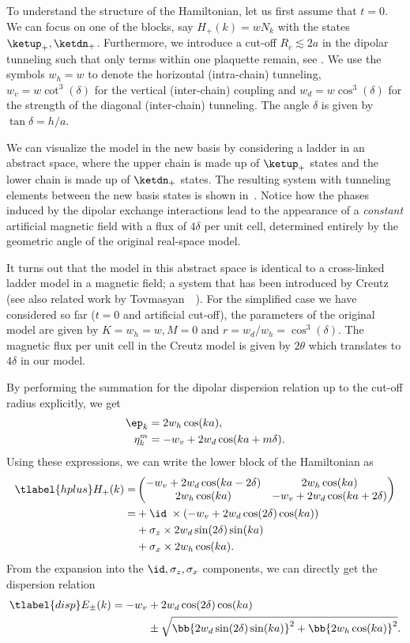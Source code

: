 To understand the structure of the Hamiltonian, let us first assume that $t=0$.
We can focus on one of the blocks, say $H_+(k) = w N_k$ with the states $\ketup_+, \ketdn_+$.
Furthermore, we introduce a cut-off $R_c \lesssim 2a$ in the dipolar tunneling such that only terms within one plaquette remain, see .
We use the symbols $w_h = w$ to denote the horizontal (intra-chain) tunneling, $w_v = w \cot^3(\delta)$ for the vertical (inter-chain) coupling and $w_d = w \cos^3(\delta)$ for the strength of the diagonal (inter-chain) tunneling.
The angle $\delta$ is given by $\tan \delta = h/a$.

We can visualize the model in the new basis by considering a ladder in an abstract space, where the upper chain is made up of $\ketup_+$ states and the lower chain is made up of $\ketdn_+$ states.
The resulting system with tunneling elements between the new basis states is shown in~.
Notice how the phases induced by the dipolar exchange interactions lead to the appearance of a \emph{constant} artificial magnetic field with a flux of $4\delta$ per unit cell, determined entirely by the geometric angle of the original real-space model.

It turns out that the model in this abstract space is identical to a cross-linked ladder model in a magnetic field; a system that has been introduced by Creutz~\cite{Creutz1999} (see also related work by Tovmasyan~\etal~\cite{Tovmasyan2013a}).
For the simplified case we have considered so far ($t=0$ and artificial cut-off), the parameters of the original model are given by $K=w_h=w, M=0$ and $r=w_d/w_h=\cos^3(\delta)$.
The magnetic flux per unit cell in the Creutz model is given by $2\theta$ which translates to $4\delta$ in our model.

By performing the summation for the dipolar dispersion relation up to the cut-off radius explicitly, we get
\begin{align}
    \ep_k &= 2 w_h \cos(ka), \\
    \eta_k^m &= -w_v + 2 w_d \cos(ka + m\delta).
\end{align}
Using these expressions, we can write the lower block of the Hamiltonian as
\begin{align} \tlabel{hplus}
    H_+(k) = &\begin{pmatrix}
        -w_v + 2w_d \cos(ka-2\delta) & 2w_h \cos(ka) \\
        2w_h\cos(ka) & -w_v + 2w_d \cos(ka+2\delta)
    \end{pmatrix} \\
    = &+\id \; \times (-w_v + 2w_d \cos(2\delta) \cos(ka)) \\
    &+\sigma_z \times 2w_d \sin(2\delta) \sin(ka) \\
    &+\sigma_x \times 2w_h \cos(ka).
\end{align}
From the expansion into the $\id, \sigma_z, \sigma_x$ components, we can directly get the dispersion relation
\begin{align} \tlabel{disp}
    E_\pm(k) = -w_v &+ 2w_d \cos(2\delta)\cos(ka) \\
                    &\pm \sqrt{ \bb{ 2w_d\sin(2\delta)\sin(ka) }^2 + \bb{ 2w_h\cos(ka) }^2 }.
\end{align}

